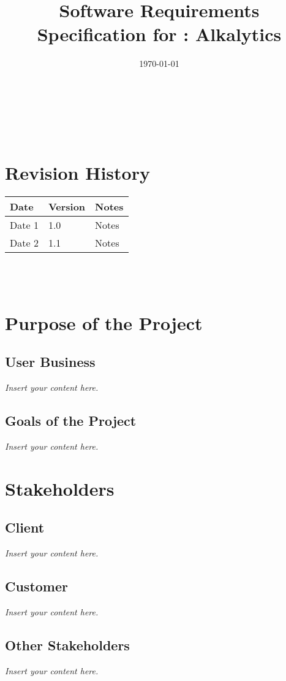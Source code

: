 \documentclass[12pt]{article}
\newcommand{\lips}{\textit{Insert your content here.}}
\begin{document}
\title{Software Requirements Specification for \progname: Alkalytics} 
\author{\authname}
\date{\today}
	
\maketitle

~\newpage


\tableofcontents

~\newpage

\section*{Revision History}

\begin{tabularx}{\textwidth}{p{3cm}p{2cm}X}
\toprule {\textbf{Date}} & {\textbf{Version}} & {\textbf{Notes}}\\
\midrule
Date 1 & 1.0 & Notes\\
Date 2 & 1.1 & Notes\\
\bottomrule
\end{tabularx}

~\\

~\newpage
\section{Purpose of the Project}
\subsection{User Business}
\lips
\subsection{Goals of the Project}
\lips
\section{Stakeholders}
\subsection{Client}
\lips
\subsection{Customer}
\lips
\subsection{Other Stakeholders}
\lips
\end{document}
